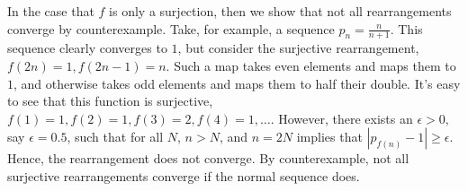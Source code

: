 \documentclass[letter]{article}
\newenvironment{menumerate}{%
  \edef\backupindent{\the\parindent}%
  \enumerate%
  \setlength{\parindent}{\backupindent}%
}{\endenumerate}
\begin{document}
\begin{menumerate}
\begin{menumerate}
	 	 	In the case that $f$ is only a surjection, then we show that not all rearrangements converge by counterexample. Take, for example, a sequence $p_n = \frac{n}{n+1}.$ This sequence clearly converges to $1$, but consider the surjective rearrangement, $f(2n) = 1, f(2n-1) = n.$ Such a map  takes even elements and maps them to $1$, and otherwise takes odd elements and maps them to half their double. It's easy to see that this function is surjective, $f(1) = 1, f(2) = 1, f(3) = 2, f(4) =1, \dots$. However, there exists an $\epsilon > 0,$ say $\epsilon = 0.5$, such that for all $N$, $n > N$, and $n= 2N$  implies that $|p_{f(n)} - 1| \geq \epsilon.$ Hence, the rearrangement does not converge. By counterexample, not all surjective rearrangements converge if the normal sequence does.

 	 	\end{menumerate}

 	 	
 	 	
\end{menumerate}
\end{document}

